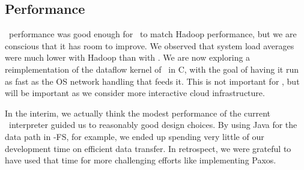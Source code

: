 
\subsection{Performance}
\JOL\ performance was good enough for \BOOMA\ to match Hadoop performance, but
we are conscious that it has room to improve.  We observed that system load
averages were much lower with Hadoop than with \BOOMA.  We are now exploring a
reimplementation of the dataflow kernel of \JOL\ in C, with the goal of having
it run as fast as the OS network handling that feeds it.  This is not important
for \BOOMA, but will be important as we consider more interactive cloud
infrastructure.

In the interim, we actually think the modest performance of the
current \JOL\ interpreter guided us to reasonably good design choices.
By using Java for the data path in \BOOM-FS, for example, we ended up
spending very little of our development time on efficient data
transfer.  In retrospect, we were grateful to have used that time for
more challenging efforts like implementing Paxos.
